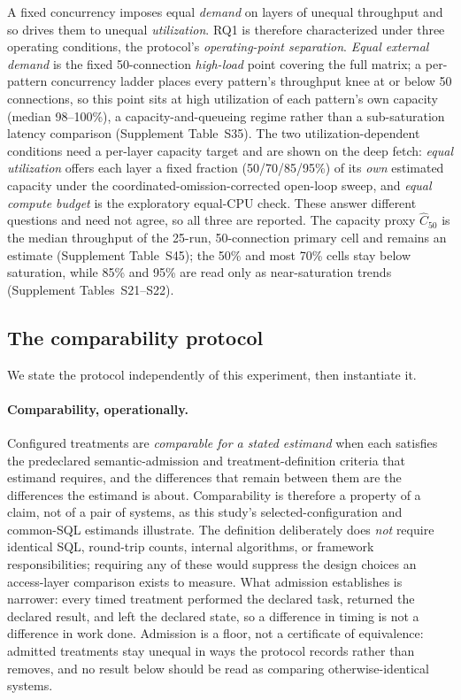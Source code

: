 A fixed concurrency imposes equal \emph{demand} on layers of unequal throughput and so drives them to unequal \emph{utilization}.
RQ1 is therefore characterized under three operating conditions, the protocol's \emph{operating-point separation}.
\emph{Equal external demand} is the fixed 50-connection \emph{high-load} point covering the full matrix; a per-pattern concurrency ladder places every pattern's throughput knee at or below 50 connections, so this point sits at high utilization of each pattern's own capacity (median 98--100\%), a capacity-and-queueing regime rather than a sub-saturation latency comparison (Supplement Table~S35).
The two utilization-dependent conditions need a per-layer capacity target and are shown on the deep fetch: \emph{equal utilization} offers each layer a fixed fraction (50/70/85/95\%) of its \emph{own} estimated capacity under the coordinated-omission-corrected open-loop sweep, and \emph{equal compute budget} is the exploratory equal-CPU check.
These answer different questions and need not agree, so all three are reported.
The capacity proxy $\widehat C_{50}$ is the median throughput of the 25-run, 50-connection primary cell and remains an estimate (Supplement Table~S45); the 50\% and most 70\% cells stay below saturation, while 85\% and 95\% are read only as near-saturation trends (Supplement Tables~S21--S22).

\subsection{The comparability protocol}
\label{sec:protocol}
We state the protocol independently of this experiment, then instantiate it.

\paragraph{Comparability, operationally.} Configured treatments are \emph{comparable for a stated estimand} when each satisfies the predeclared semantic-admission and treatment-definition criteria that estimand requires, and the differences that remain between them are the differences the estimand is about.
Comparability is therefore a property of a claim, not of a pair of systems, as this study's selected-configuration and common-SQL estimands illustrate.
The definition deliberately does \emph{not} require identical SQL, round-trip counts, internal algorithms, or framework responsibilities; requiring any of these would suppress the design choices an access-layer comparison exists to measure.
What admission establishes is narrower: every timed treatment performed the declared task, returned the declared result, and left the declared state, so a difference in timing is not a difference in work done.
Admission is a floor, not a certificate of equivalence: admitted treatments stay unequal in ways the protocol records rather than removes, and no result below should be read as comparing otherwise-identical systems.

